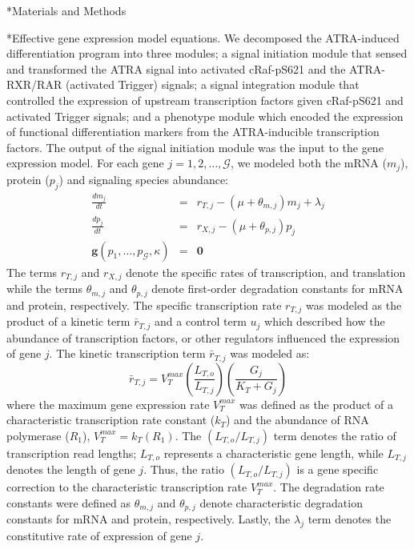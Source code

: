 \documentclass[12pt]{article}
\makeatletter
\renewcommand\subsubsection{\@startsection
	{subsubsection}{2}{0mm}
	{-0.05in}
	{-0.5\baselineskip}
	{\normalfont\normalsize\itshape}}
\renewcommand\section{\@startsection
	{subsection}{2}{0mm}
	{-0.2in}
	{0.05\baselineskip}
	{\normalfont\large\bfseries}}
\makeatother
\begin{document}
\clearpage

\section*{Materials and Methods}

\subsubsection*{Effective gene expression model equations.}
We decomposed the ATRA-induced differentiation program into three modules;
a signal initiation module that sensed and transformed the ATRA signal into activated cRaf-pS621 and the ATRA-RXR/RAR (activated Trigger) signals;
a signal integration module that controlled the expression of upstream transcription factors given cRaf-pS621 and activated Trigger signals; and
a phenotype module which encoded the expression of functional differentiation markers from the ATRA-inducible transcription factors.
The output of the signal initiation module was the input to the gene expression model.
For each gene $j=1,2,\dots,\mathcal{G}$, we modeled both the mRNA ($m_{j}$), protein ($p_{j}$) and signaling species abundance:
\begin{eqnarray}
	\frac{dm_{j}}{dt} &=& r_{T,j} - \left(\mu+\theta_{m,j}\right)m_{j}+\lambda_{j}\\
	\frac{dp_{j}}{dt} &=& r_{X,j} - \left(\mu+\theta_{p,j}\right)p_{j}\\\label{eqn-signaling-balances}
	\mathbf{g}\left(p_{1},\hdots,p_{\mathcal{G}},\kappa\right) &=& \mathbf{0}
\end{eqnarray}
The terms $r_{T,j}$ and $r_{X,j}$ denote the specific rates of transcription, and translation while
the terms $\theta_{m,j}$ and $\theta_{p,j}$ denote first-order degradation constants for mRNA and protein, respectively.
The specific transcription rate $r_{T,j}$ was modeled as the product of a kinetic term $\bar{r}_{T,j}$ and a control term $u_{j}$ which described how the
abundance of transcription factors, or other regulators influenced the expression of gene $j$.
The kinetic transcription term $\bar{r}_{T,j}$ was modeled as:
\begin{equation}
	\bar{r}_{T,j} = V^{max}_{T}\left(\frac{L_{T,o}}{L_{T,j}}\right)\left(\frac{G_{j}}{K_{T}+G_{j}}\right)
\end{equation}where the maximum gene expression rate $V^{max}_{T}$ was defined as the product of a characteristic transcription rate constant ($k_{T}$)
and the abundance of RNA polymerase ($R_{1}$), $V^{max}_{T} = k_{T}\left(R_{1}\right)$.
The $\left(L_{T,o}/L_{T,j}\right)$ term denotes the ratio of transcription read lengths; $L_{T,o}$ represents a characteristic gene length, while $L_{T,j}$ denotes the length of gene $j$.
Thus, the ratio $\left(L_{T,o}/L_{T,j}\right)$ is a gene specific correction to the characteristic transcription rate $V^{max}_{T}$.
The degradation rate constants were defined as $\theta_{m,j}$ and $\theta_{p,j}$ denote characteristic degradation constants for mRNA and protein, respectively.
Lastly, the $\lambda_{j}$ term denotes the constitutive rate of expression of gene $j$.
\end{document}
